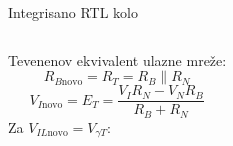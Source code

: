 \begin{frame}[label=10-s033]{Integrisano RTL kolo}
\setlength{\abovedisplayskip}{4pt}\setlength{\belowdisplayskip}{4pt}\setlength{\abovedisplayshortskip}{3pt}\setlength{\belowdisplayshortskip}{3pt}
\begin{columns}[T,onlytextwidth]\centering \raggedright
Tevenenov ekvivalent ulazne mreže:
\[R_{B\mathrm{novo}}=R_T=R_B\parallel R_N\]
\[V_{I\mathrm{novo}}=E_T=\frac{V_IR_N-V_NR_B}{R_B+R_N}\]
Za $V_{IL\mathrm{novo}}=V_{\gamma T}$:
\end{columns}
\end{frame}
